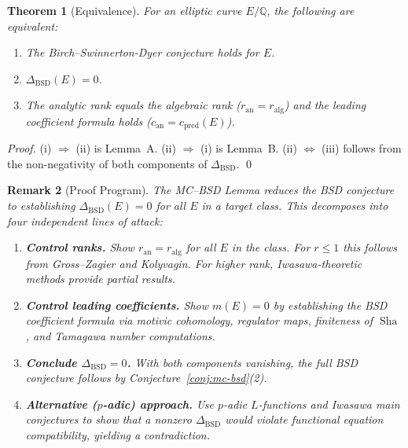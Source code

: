 \documentclass[11pt]{article}
\newtheorem{theorem}{Theorem}[section]
\newtheorem{remark}[theorem]{Remark}
\DeclareMathOperator{\Sha}{Sha}
\begin{document}
\begin{theorem}[Equivalence]
\label{thm:bsd-equiv}
For an elliptic curve $E/\mathbb{Q}$, the following are equivalent:
\begin{enumerate}
  \item[(i)] The Birch--Swinnerton-Dyer conjecture holds for $E$.
  \item[(ii)] $\Delta_{\mathrm{BSD}}(E) = 0$.
  \item[(iii)] The analytic rank equals the algebraic rank ($r_{\mathrm{an}} = r_{\mathrm{alg}}$) and the leading coefficient formula holds ($c_{\mathrm{an}} = c_{\mathrm{pred}}(E)$).
\end{enumerate}
\end{theorem}

\begin{proof}
(i) $\Rightarrow$ (ii) is Lemma~A. (ii) $\Rightarrow$ (i) is Lemma~B. (ii) $\Leftrightarrow$ (iii) follows from the non-negativity of both components of $\Delta_{\mathrm{BSD}}$. \qed
\end{proof}

\begin{remark}[Proof Program]
\label{rem:proof-program}
The MC--BSD Lemma reduces the BSD conjecture to establishing
$\Delta_{\mathrm{BSD}}(E) = 0$ for all $E$ in a target class.  This
decomposes into four independent lines of attack:
\begin{enumerate}
\item \textbf{Control ranks.}\quad
  Show $r_{\mathrm{an}} = r_{\mathrm{alg}}$ for all $E$ in the class.
  For $r \le 1$ this follows from Gross--Zagier and Kolyvagin.
  For higher rank, Iwasawa-theoretic methods provide partial results.
\item \textbf{Control leading coefficients.}\quad
  Show $m(E) = 0$ by establishing the BSD coefficient formula via
  motivic cohomology, regulator maps, finiteness of $\Sha$, and
  Tamagawa number computations.
\item \textbf{Conclude $\Delta_{\mathrm{BSD}} = 0$.}\quad
  With both components vanishing, the full BSD conjecture follows
  by Conjecture~\ref{conj:mc-bsd}(2).
\item \textbf{Alternative ($p$-adic) approach.}\quad
  Use $p$-adic $L$-functions and Iwasawa main conjectures to show
  that a nonzero $\Delta_{\mathrm{BSD}}$ would violate functional
  equation compatibility, yielding a contradiction.
\end{enumerate}
\end{remark}
\end{document}
